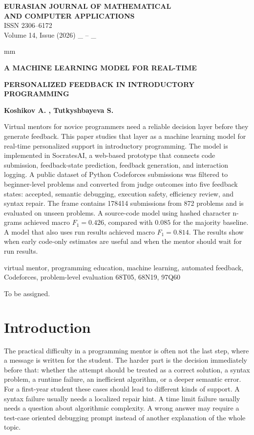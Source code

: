 \documentclass[twoside,11pt]{article}
\begin{document}
\thispagestyle{empty}
\begin{flushleft}
{\small {\bf EURASIAN JOURNAL OF MATHEMATICAL\\ AND COMPUTER APPLICATIONS}\\
ISSN 2306--6172\\
Volume 14, Issue (2026) \_ -- \_}
\end{flushleft}
 mm

\centerline{\bf A MACHINE LEARNING MODEL FOR REAL-TIME}
\centerline{\bf PERSONALIZED FEEDBACK IN INTRODUCTORY PROGRAMMING}

\vskip 0.2cm
\centerline{\bf Koshikov A. , Tutkyshbayeva S. }

\vskip 0.2cm
{\small
Virtual mentors for novice programmers need a reliable decision layer before they generate feedback. This paper studies that layer as a machine learning model for real-time personalized support in introductory programming. The model is implemented in SocratesAI, a web-based prototype that connects code submission, feedback-state prediction, feedback generation, and interaction logging. A public dataset of Python Codeforces submissions was filtered to beginner-level problems and converted from judge outcomes into five feedback states: accepted, semantic debugging, execution safety, efficiency review, and syntax repair. The frame contains 178414 submissions from 872 problems and is evaluated on unseen problems. A source-code model using hashed character n-grams achieved macro $F_1=0.426$, compared with $0.085$ for the majority baseline. A model that also uses run results achieved macro $F_1=0.814$. The results show when early code-only estimates are useful and when the mentor should wait for run results.}

\vskip 0.2cm
 virtual mentor, programming education, machine learning, automated feedback, Codeforces, problem-level evaluation
\vskip 0.2cm
 68T05, 68N19, 97Q60

\vskip 0.2cm
 To be assigned.
\vskip 0.3cm

\section{\large Introduction}

The practical difficulty in a programming mentor is often not the last step, where a message is written for the student. The harder part is the decision immediately before that: whether the attempt should be treated as a correct solution, a syntax problem, a runtime failure, an inefficient algorithm, or a deeper semantic error. For a first-year student these cases should lead to different kinds of support. A syntax failure usually needs a localized repair hint. A time limit failure usually needs a question about algorithmic complexity. A wrong answer may require a test-case oriented debugging prompt instead of another explanation of the whole topic.
\end{document}
